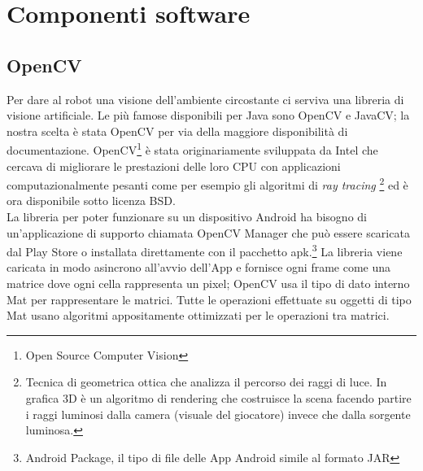 \chapter{Componenti software}
\fancyfoot[C]{\thepage } 
\section {OpenCV}
Per dare al robot una visione dell'ambiente circostante ci serviva una libreria di 
visione artificiale. Le più famose disponibili per Java sono OpenCV e JavaCV; 
la nostra scelta è stata OpenCV per via della maggiore disponibilità di documentazione. 
OpenCV\footnote{Open Source Computer Vision} è stata originariamente sviluppata 
da Intel che cercava di migliorare le prestazioni delle loro CPU con applicazioni
computazionalmente pesanti come per esempio gli algoritmi di \textit{ray tracing}
\footnote{Tecnica di geometrica ottica che analizza il percorso dei raggi di luce.
In grafica 3D è un algoritmo di rendering che costruisce la scena facendo
partire i raggi luminosi dalla camera (visuale del giocatore) invece che dalla 
sorgente luminosa.\cite{ray_tracing}}  ed è ora disponibile sotto licenza BSD. 
\\La libreria per poter funzionare su un 
 dispositivo Android ha bisogno di un'applicazione di supporto chiamata OpenCV 
 Manager che può essere scaricata dal Play Store o installata direttamente con il
 pacchetto apk.\footnote{Android Package, il tipo di file delle App Android simile 
 al formato JAR } La libreria viene caricata in modo asincrono all'avvio dell'App
 e fornisce ogni frame come una matrice dove ogni cella rappresenta un pixel; 
 OpenCV usa il tipo di dato interno Mat per rappresentare le matrici.
 Tutte le operazioni effettuate su oggetti di tipo Mat usano algoritmi appositamente 
 ottimizzati per le operazioni tra matrici. 

